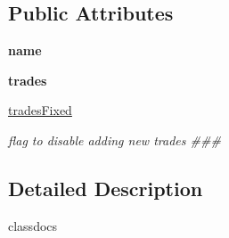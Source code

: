 \subsection*{\-Public \-Attributes}
\begin{DoxyCompactItemize}
\item 
\hypertarget{classstrategy__tester_1_1Portfolio_1_1Portfolio_a090729feab7077acb195565b8cc3b501}{{\bfseries name}}\label{classstrategy__tester_1_1Portfolio_1_1Portfolio_a090729feab7077acb195565b8cc3b501}

\item 
\hypertarget{classstrategy__tester_1_1Portfolio_1_1Portfolio_abcba75c8a3a87ba85291c8d8d5d47632}{{\bfseries trades}}\label{classstrategy__tester_1_1Portfolio_1_1Portfolio_abcba75c8a3a87ba85291c8d8d5d47632}

\item 
\hypertarget{classstrategy__tester_1_1Portfolio_1_1Portfolio_a2e90711c623c849198cac7cc583fd182}{\hyperlink{classstrategy__tester_1_1Portfolio_1_1Portfolio_a2e90711c623c849198cac7cc583fd182}{trades\-Fixed}}\label{classstrategy__tester_1_1Portfolio_1_1Portfolio_a2e90711c623c849198cac7cc583fd182}

\begin{DoxyCompactList}\small\item\em flag to disable adding new trades \#\#\# \end{DoxyCompactList}\end{DoxyCompactItemize}


\subsection{\-Detailed \-Description}
\begin{DoxyVerb}
classdocs
\end{DoxyVerb}
 

